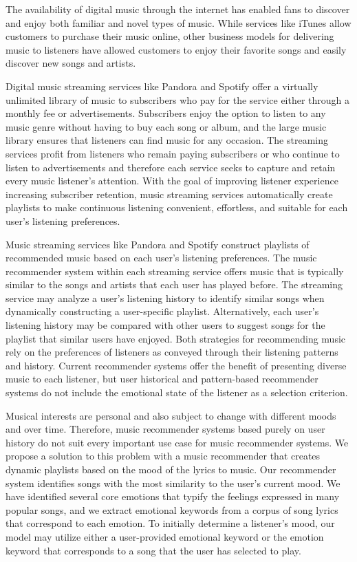 \documentclass[10pt,twocolumn]{article}
\begin{document}
The availability of digital music through the internet has enabled fans to discover and enjoy both familiar and novel types of music.  While services like iTunes \cite{a16} allow customers to purchase their music online, other business models for delivering music to listeners have allowed customers to enjoy their favorite songs and easily discover new songs and artists.

Digital music streaming services like Pandora \cite{a12} and Spotify \cite{a13} offer a virtually unlimited library of music to subscribers who pay for the service either through a monthly fee or advertisements.  Subscribers enjoy the option to listen to any music genre without having to buy each song or album, and the large music library ensures that listeners can find music for any occasion.  The streaming services profit from listeners who remain paying subscribers or who continue to listen to advertisements and therefore each service seeks to capture and retain every music listener's attention.  With the goal of improving listener experience increasing subscriber retention, music streaming services automatically create playlists to make continuous listening convenient, effortless, and suitable for each user's listening preferences.

Music streaming services like Pandora and Spotify construct playlists of recommended music based on each user's listening preferences.  The music recommender system within each streaming service offers music that is typically similar to the songs and artists that each user has played before.  The streaming service may analyze a user's listening history to identify similar songs when dynamically constructing a user-specific playlist.  Alternatively, each user's listening history may be compared with other users to suggest songs for the playlist that similar users have enjoyed.  Both strategies for recommending music rely on the preferences of listeners as conveyed through their listening patterns and history.  Current recommender systems offer the benefit of presenting diverse music to each listener, but user historical and pattern-based recommender systems do not include the emotional state of the listener as a selection criterion.

Musical interests are personal and also subject to change with different moods and over time.  Therefore, music recommender systems based purely on user history do not suit every important use case for music recommender systems.  We propose a solution to this problem with a music recommender that creates dynamic playlists based on the mood of the lyrics to music.  Our recommender system identifies songs with the most similarity to the user's current mood.  We have identified several core emotions that typify the feelings expressed in many popular songs, and we extract emotional keywords from a corpus of song lyrics that correspond to each emotion.  To initially determine a listener's mood, our model may utilize either a user-provided emotional keyword or the emotion keyword that corresponds to a song that the user has selected to play.
\end{document}
